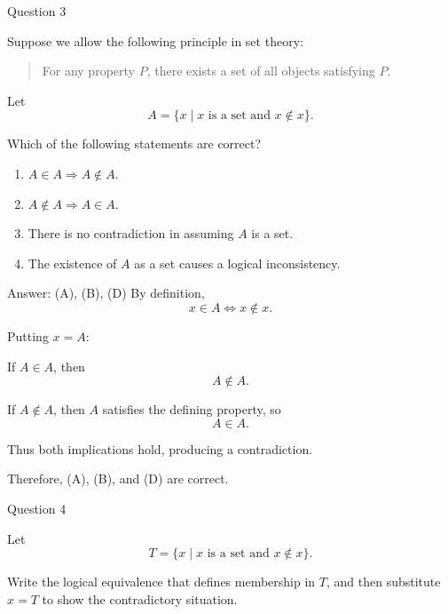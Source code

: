 \documentclass[aspectratio=169,11pt]{beamer}
\begin{document}

\begin{frame}{Question 3}

Suppose we allow the following principle in set theory:

\begin{quote}
For any property $P$, there exists a set of all objects satisfying $P$.
\end{quote}

Let
$$
A=\{x\mid x\text{ is a set and }x\notin x\}.
$$

Which of the following statements are correct?

\begin{enumerate}
    \item[(A)] $A\in A\Rightarrow A\notin A$.
    \item[(B)] $A\notin A\Rightarrow A\in A$.
    \item[(C)] There is no contradiction in assuming $A$ is a set.
    \item[(D)] The existence of $A$ as a set causes a logical inconsistency.
\end{enumerate}

\end{frame}

\begin{frame}

\begin{block}{Answer: (A), (B), (D)}
By definition,
$$
x\in A\iff x\notin x.
$$

Putting $x=A$:

If $A\in A$, then
$$
A\notin A.
$$

If $A\notin A$, then $A$ satisfies the defining property, so
$$
A\in A.
$$

Thus both implications hold, producing a contradiction.

Therefore, (A), (B), and (D) are correct.
\end{block}

\end{frame}


\begin{frame}{Question 4}

Let
$$
T=\{x\mid x\text{ is a set and }x\notin x\}.
$$

Write the logical equivalence that defines membership in $T$, and then
substitute $x=T$ to show the contradictory situation.

\end{frame}
\end{document}
